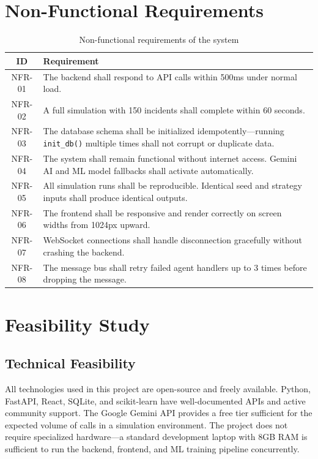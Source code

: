 \section{Non-Functional Requirements}
\label{sec:non_functional_requirements}

\begin{table}[H]
\centering
\caption{Non-functional requirements of the system}
\label{tab:nonfunctional_req}
\begin{tabularx}{\textwidth}{|c|X|}
\hline
\textbf{ID} & \textbf{Requirement} \\
\hline
NFR-01 & The backend shall respond to API calls within 500ms under normal load. \\
\hline
NFR-02 & A full simulation with 150 incidents shall complete within 60 seconds. \\
\hline
NFR-03 & The database schema shall be initialized idempotently---running \texttt{init\_db()} multiple times shall not corrupt or duplicate data. \\
\hline
NFR-04 & The system shall remain functional without internet access. Gemini AI and ML model fallbacks shall activate automatically. \\
\hline
NFR-05 & All simulation runs shall be reproducible. Identical seed and strategy inputs shall produce identical outputs. \\
\hline
NFR-06 & The frontend shall be responsive and render correctly on screen widths from 1024px upward. \\
\hline
NFR-07 & WebSocket connections shall handle disconnection gracefully without crashing the backend. \\
\hline
NFR-08 & The message bus shall retry failed agent handlers up to 3 times before dropping the message. \\
\hline
\end{tabularx}
\end{table}

\section{Feasibility Study}
\label{sec:feasibility_study}

\subsection{Technical Feasibility}

All technologies used in this project are open-source and freely available. Python, FastAPI, React, SQLite, and scikit-learn have well-documented APIs and active community support. The Google Gemini API provides a free tier sufficient for the expected volume of calls in a simulation environment. The project does not require specialized hardware---a standard development laptop with 8GB RAM is sufficient to run the backend, frontend, and ML training pipeline concurrently.

